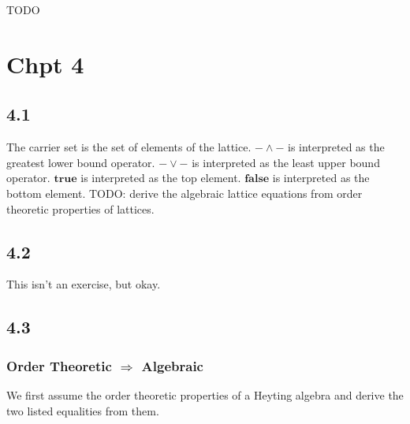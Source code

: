 \documentclass{article}
\newcommand{\mbf}{\mathbf}
\begin{document}
TODO

\section*{Chpt 4} 

\subsection*{4.1}

The carrier set is the set of elements of the lattice. $- \wedge -$ is interpreted as the greatest lower bound operator.
$- \vee -$ is interpreted as the least upper bound operator. $\mbf{true}$ is interpreted as the top element. $\mbf{false}$ 
is interpreted as the bottom element. TODO: derive the algebraic lattice equations from order theoretic properties of lattices.

\subsection*{4.2}

This isn't an exercise, but okay.

\subsection*{4.3}

\subsubsection*{Order Theoretic $\Rightarrow$ Algebraic}

We first assume the order theoretic properties of a Heyting algebra and derive the two listed equalities from them.
\end{document}
